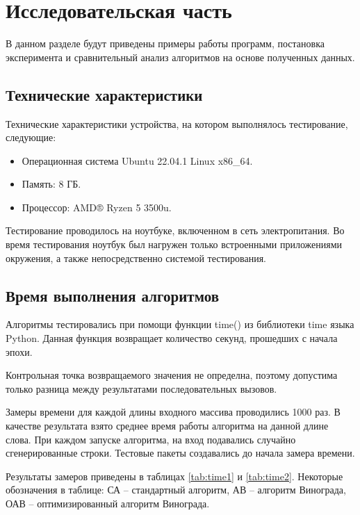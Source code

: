 \chapter{Исследовательская часть}

В данном разделе будут приведены примеры работы программ, постановка эксперимента и сравнительный анализ алгоритмов на основе полученных данных.

\section{Технические характеристики}

Технические характеристики устройства, на котором выполнялось тестирование, следующие:

\begin{itemize}
	\item Операционная система Ubuntu 22.04.1 \cite{ubuntu} Linux x86\_64.
	\item Память: 8 ГБ.
	\item Процессор: AMD® Ryzen 5 3500u.
\end{itemize}

Тестирование проводилось на ноутбуке, включенном в сеть электропитания. Во время тестирования ноутбук был нагружен только встроенными приложениями окружения, а также непосредственно системой тестирования.


\section{Время выполнения алгоритмов}

Алгоритмы тестировались при помощи функции time() из библиотеки time языка Python. Данная функция возвращает количество секунд, прошедших с начала эпохи.

Контрольная точка возвращаемого значения не определна, поэтому допустима только разница между результатами последовательных вызовов.

Замеры времени для каждой длины входного массива проводились 1000 раз. В качестве результата взято среднее время работы алгоритма на данной длине слова. При каждом запуске алгоритма, на вход подавались случайно сгенерированные строки. Тестовые пакеты создавались до начала замера времени.

Результаты замеров приведены в таблицах \ref{tab:time1} и \ref{tab:time2}. Некоторые обозначения в таблице: СА -- стандартный алгоритм, АВ -- алгоритм Винограда, ОАВ -- оптимизированный алгоритм Винограда.

